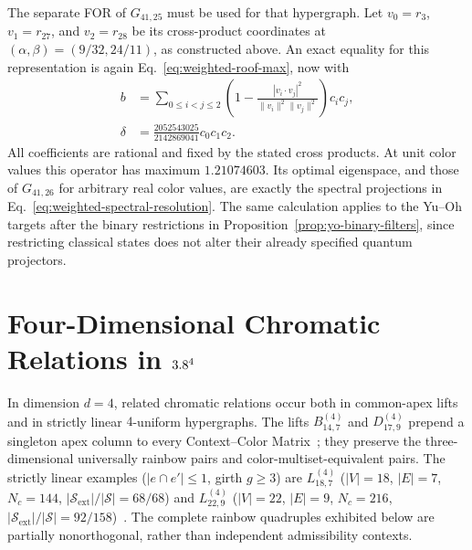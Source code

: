 \documentclass[aps,pra,reprint,superscriptaddress,longbibliography,nofootinbib,floatfix,10pt]{revtex4-2}
\theoremstyle{definition}\newtheorem{definition}[theorem]{Definition}
\theoremstyle{remark}\newtheorem{remark}[theorem]{Remark}
\newcommand{\Sc}{\mathcal S}\newcommand{\Cc}{\mathcal C}\newcommand{\Wc}{\mathcal W}
\begin{document}
The separate FOR of $G_{41,25}$ must be used for that hypergraph. Let $v_0=r_3$, $v_1=r_{27}$, and $v_2=r_{28}$ be its cross-product coordinates at $(\alpha,\beta)=(9/32,24/11)$, as constructed above. An exact equality for this representation is again Eq.~\eqref{eq:weighted-roof-max}, now with
\begin{equation}\label{eq:weighted-roof25-coefficients}
\begin{aligned}
b&=\sum_{0\le i<j\le2}\left(1-
\frac{|v_i\cdot v_j|^2}{\|v_i\|^2\|v_j\|^2}\right)c_ic_j,\\
\delta&=\frac{2052543025}{2142869041}c_0c_1c_2.
\end{aligned}
\end{equation}
All coefficients are rational and fixed by the stated cross products. At unit color values this operator has maximum $1.21074603$. Its optimal eigenspace, and those of $G_{41,26}$ for arbitrary real color values, are exactly the spectral projections in Eq.~\eqref{eq:weighted-spectral-resolution}. The same calculation applies to the Yu--Oh targets after the binary restrictions in Proposition~\ref{prop:yo-binary-filters}, since restricting classical states does not alter their already specified quantum projectors.

\section{Four-Dimensional Chromatic Relations in \texorpdfstring{$3.8^4$}{R4}}\label{sec:4d}

In dimension $d=4$, related chromatic relations occur both in common-apex lifts and in strictly linear $4$-uniform hypergraphs. The lifts $B_{14,7}^{(4)}$ and $D_{17,9}^{(4)}$ prepend a singleton apex column to every Context--Color Matrix~\cite[Proposition~2]{2026-latin-context-matrix}; they preserve the three-dimensional universally rainbow pairs and color-multiset-equivalent pairs. The strictly linear examples ($|e\cap e'|\le1$, girth $g\ge3$) are $L_{18,7}^{(4)}$ ($|V|=18$, $|E|=7$, $N_c=144$, $|\Sc_{\mathrm{ext}}|/|\Sc|=68/68$) and $L_{22,9}^{(4)}$ ($|V|=22$, $|E|=9$, $N_c=216$, $|\Sc_{\mathrm{ext}}|/|\Sc|=92/158$)~\cite{svozil2026contexts,2026-latin-context-matrix}. The complete rainbow quadruples exhibited below are partially nonorthogonal, rather than independent admissibility contexts.
\end{document}
